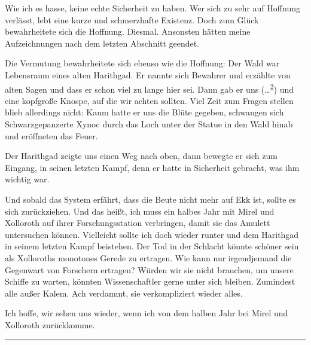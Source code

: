 \documentclass[11pt]{scrartcl}
\begin{document}
Wie ich es hasse, keine echte Sicherheit zu haben. Wer sich zu sehr auf
Hoffnung verlässt, lebt eine kurze und schmerzhafte Existenz. Doch zum
Glück bewahrheitete sich die Hoffnung. Diesmal. Ansonsten hätten meine
Aufzeichnungen nach dem letzten Abschnitt geendet.

Die Vermutung bewahrheitete sich ebenso wie die Hoffnung: Der Wald war
Lebensraum eines alten Harithgad. Er nannte sich Bewahrer und erzählte
von alten Sagen und dass er schon viel zu lange hier sei. Dann gab er
uns
(\ldots{}\textsuperscript{\href{http://1w6.org/print/book/export/html/59\#fn:1}{2}})
und eine kopfgroße Knospe, auf die wir achten sollten. Viel Zeit zum
Fragen stellen blieb allerdings nicht: Kaum hatte er uns die Blüte
gegeben, schwangen sich Schwarzgepanzerte Xynoc durch das Loch unter der
Statue in den Wald hinab und eröffneten das Feuer.

Der Harithgad zeigte uns einen Weg nach oben, dann bewegte er sich zum
Eingang, in seinen letzten Kampf, denn er hatte in Sicherheit gebracht,
was ihm wichtig war.

Und sobald das System erfährt, dass die Beute nicht mehr auf Ekk ist,
sollte es sich zurückziehen. Und das heißt, ich muss ein halbes Jahr mit
Mirel und Xolloroth auf ihrer Forschungsstation verbringen, damit sie
das Amulett untersuchen können. Vielleicht sollte ich doch wieder runter
und dem Harithgad in seinem letzten Kampf beistehen. Der Tod in der
Schlacht könnte schöner sein als Xolloroths monotones Gerede zu
ertragen. Wie kann nur irgendjemand die Gegenwart von Forschern
ertragen? Würden wir sie nicht brauchen, um unsere Schiffe zu warten,
könnten Wissenschaftler gerne unter sich bleiben. Zumindest alle außer
Kalem. Ach verdammt, sie verkompliziert wieder alles.

Ich hoffe, wir sehen uns wieder, wenn ich von dem halben Jahr bei Mirel
und Xolloroth zurückkomme.

\begin{center}\rule{3in}{0.4pt}\end{center}
\end{document}
